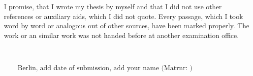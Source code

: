 
I promise, that I wrote my thesis by myself and that I did not use other references or auxiliary aids, which I did not quote. Every passage, which I took word by word or analogous out of other sources, have been marked properly. The work or an similar work was not handed before at another examination office.

~~~\\

\vspace{5cm}

$\overline{~~~~~~~~~\mbox{Berlin, add date of submission, add your name (Matrnr: )}~~~~~~~~~}$


